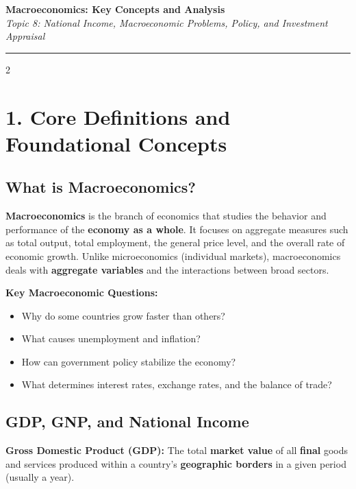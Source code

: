 \documentclass[10pt,a4paper]{article}
\begin{document}
\begin{center}
{\LARGE \textbf{Macroeconomics: Key Concepts and Analysis}}\\[0.15cm]
{\normalsize \textit{Topic 8: National Income, Macroeconomic Problems, Policy, and Investment Appraisal}}\\[0.15cm]
\hrule
\end{center}
\vspace{-0.3cm}

\begin{multicols}{2}
\footnotesize

\section*{1. Core Definitions and Foundational Concepts}

\subsection*{What is Macroeconomics?}
\textbf{Macroeconomics} is the branch of economics that studies the behavior and performance of the \textbf{economy as a whole}. It focuses on aggregate measures such as total output, total employment, the general price level, and the overall rate of economic growth. Unlike microeconomics (individual markets), macroeconomics deals with \textbf{aggregate variables} and the interactions between broad sectors.

\textbf{Key Macroeconomic Questions:}
\begin{itemize}[leftmargin=*,nosep]
    \item Why do some countries grow faster than others?
    \item What causes unemployment and inflation?
    \item How can government policy stabilize the economy?
    \item What determines interest rates, exchange rates, and the balance of trade?
\end{itemize}

\subsection*{GDP, GNP, and National Income}
\textbf{Gross Domestic Product (GDP):} The total \textbf{market value} of all \textbf{final} goods and services produced within a country's \textbf{geographic borders} in a given period (usually a year).


\end{multicols}
\end{document}
